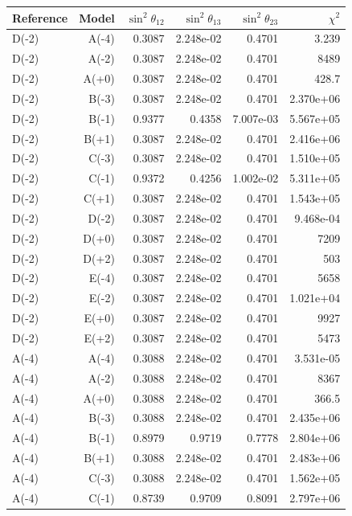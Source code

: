 \begin{table}[htbp]
\centering
\small
\setlength{\tabcolsep}{3.4pt}
\begin{tabular}{lrrrrr}
\hline
Reference & Model & $\sin^2\theta_{12}$ & $\sin^2\theta_{13}$ & $\sin^2\theta_{23}$ & $\chi^2$ \\
\hline
D(-2) & A(-4) & 0.3087 & 2.248e-02 & 0.4701 & 3.239 \\
D(-2) & A(-2) & 0.3087 & 2.248e-02 & 0.4701 & 8489 \\
D(-2) & A(+0) & 0.3087 & 2.248e-02 & 0.4701 & 428.7 \\
D(-2) & B(-3) & 0.3087 & 2.248e-02 & 0.4701 & 2.370e+06 \\
D(-2) & B(-1) & 0.9377 & 0.4358 & 7.007e-03 & 5.567e+05 \\
D(-2) & B(+1) & 0.3087 & 2.248e-02 & 0.4701 & 2.416e+06 \\
D(-2) & C(-3) & 0.3087 & 2.248e-02 & 0.4701 & 1.510e+05 \\
D(-2) & C(-1) & 0.9372 & 0.4256 & 1.002e-02 & 5.311e+05 \\
D(-2) & C(+1) & 0.3087 & 2.248e-02 & 0.4701 & 1.543e+05 \\
D(-2) & D(-2) & 0.3087 & 2.248e-02 & 0.4701 & 9.468e-04 \\
D(-2) & D(+0) & 0.3087 & 2.248e-02 & 0.4701 & 7209 \\
D(-2) & D(+2) & 0.3087 & 2.248e-02 & 0.4701 & 503 \\
D(-2) & E(-4) & 0.3087 & 2.248e-02 & 0.4701 & 5658 \\
D(-2) & E(-2) & 0.3087 & 2.248e-02 & 0.4701 & 1.021e+04 \\
D(-2) & E(+0) & 0.3087 & 2.248e-02 & 0.4701 & 9927 \\
D(-2) & E(+2) & 0.3087 & 2.248e-02 & 0.4701 & 5473 \\
A(-4) & A(-4) & 0.3088 & 2.248e-02 & 0.4701 & 3.531e-05 \\
A(-4) & A(-2) & 0.3088 & 2.248e-02 & 0.4701 & 8367 \\
A(-4) & A(+0) & 0.3088 & 2.248e-02 & 0.4701 & 366.5 \\
A(-4) & B(-3) & 0.3088 & 2.248e-02 & 0.4701 & 2.435e+06 \\
A(-4) & B(-1) & 0.8979 & 0.9719 & 0.7778 & 2.804e+06 \\
A(-4) & B(+1) & 0.3088 & 2.248e-02 & 0.4701 & 2.483e+06 \\
A(-4) & C(-3) & 0.3088 & 2.248e-02 & 0.4701 & 1.562e+05 \\
A(-4) & C(-1) & 0.8739 & 0.9709 & 0.8091 & 2.797e+06 \\

\end{tabular}
\end{table}
